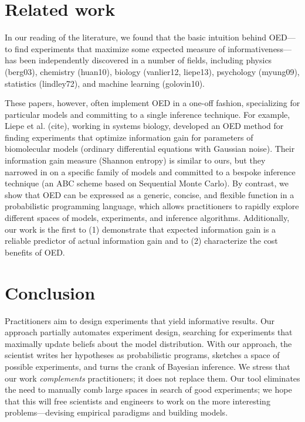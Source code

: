 \documentclass{article}
\begin{document}

\section{Related work}

In our reading of the literature, we found that the basic intuition behind OED---to find experiments that maximize some expected measure of informativeness---has been independently discovered in a number of fields, including physics (berg03), chemistry (huan10), biology (vanlier12, liepe13), psychology (myung09), statistics (lindley72), and machine learning (golovin10).

These papers, however, often implement OED in a one-off fashion, specializing for  particular models and committing to a single inference technique.
For example, Liepe et al. (cite), working in systems biology, developed an OED method for finding experiments that optimize information gain for parameters of biomolecular models (ordinary differential equations with Gaussian noise).
Their information gain measure (Shannon entropy) is similar to ours, but they narrowed in on a specific family of models and committed to a bespoke inference technique (an ABC scheme based on Sequential Monte Carlo).
By contrast, we show that OED can be expressed as a generic, concise, and flexible function in a probabilistic programming language, which allows practitioners to rapidly explore different spaces of models, experiments, and inference algorithms.
Additionally, our work is the first to (1) demonstrate that expected information gain is a reliable predictor of actual information gain and to (2) characterize the cost benefits of OED.

\section{Conclusion}

Practitioners aim to design experiments that yield informative results.
Our approach partially automates experiment design, searching for experiments that maximally update beliefs about the model distribution.
With our approach, the scientist writes her hypotheses as probabilistic programs, sketches a space of possible experiments, and turns the crank of Bayesian inference.
We stress that our work \emph{complements} practitioners; it does not replace them.
Our tool eliminates the need to manually comb large spaces in search of good experiments; we hope that this will free scientists and engineers to work on the more interesting problems---devising empirical paradigms and building models.
\end{document}

